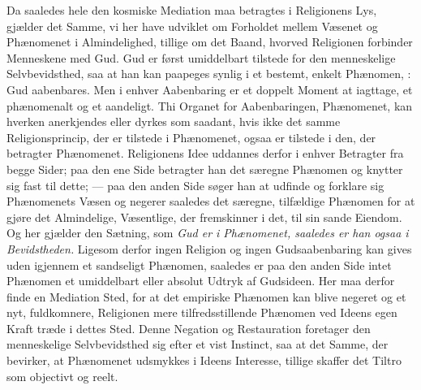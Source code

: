 \documentclass[12pt]{book}
\newcommand{\dsi}{\reflectbox{c}:}
\newcommand{\opage}[1]{\marginnote{\footnotesize\textit{[#1]}}}
\begin{document}
Da saaledes hele den kosmiske Mediation maa betragtes i Religionens Lys,
gjælder det Samme, vi her have udviklet om Forholdet mellem Væsenet og
Phænomenet i Almindelighed, tillige om det Baand, hvorved Religionen forbinder
Menneskene med Gud. Gud er først umiddelbart tilstede for den menneskelige
Selvbevidsthed, saa at han kan paapeges synlig i et bestemt, enkelt Phænomen,
\dsi{} Gud aabenbares. Men i enhver Aabenbaring er et doppelt Moment at
iagttage, et phænomenalt og et aandeligt. Thi Organet for Aabenbaringen,
Phænomenet, kan hverken anerkjendes eller dyrkes som saadant, hvis ikke det
samme Religionsprincip, der er tilstede i Phænomenet, ogsaa er tilstede i den,
der betragter Phænomenet. Religionens Idee uddannes derfor i enhver Betragter
fra begge Sider; paa den ene Side betragter han det særegne Phænomen og knytter
sig fast til dette; --- paa den anden Side søger han at udfinde og forklare sig
Phænomenets Væsen og negerer saaledes det særegne, tilfældige Phænomen for at
gjøre det Almindelige, Væsentlige, der fremskinner i det, til sin sande
Eiendom. Og her gjælder den Sætning, som \emph{Gud er i Phænomenet, saaledes er
han ogsaa i Bevidstheden.} Ligesom derfor ingen Religion og ingen
Gudsaabenbaring kan gives uden igjennem et sandseligt Phænomen, saaledes er paa
den anden Side intet Phænomen et umiddelbart eller absolut Udtryk af Gudsideen.
Her maa derfor finde en Mediation Sted, for at det empiriske Phænomen kan blive
negeret og et nyt, fuldkomnere, Religionen mere tilfredsstillende Phænomen ved
Ideens egen Kraft træde i dettes Sted. Denne Negation og Restauration foretager
den menneskelige Selvbevidsthed sig efter et vist Instinct, saa at
\opage{129} \setcounter{footnote}{0}%
det Samme, der bevirker, at Phænomenet udsmykkes i Ideens Interesse, tillige
skaffer det Tiltro som objectivt og reelt.
\end{document}
